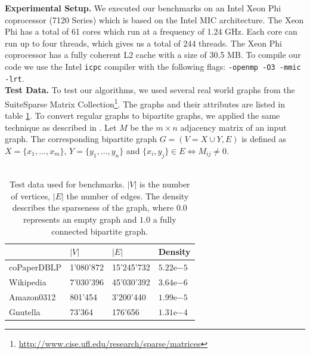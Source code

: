 \documentclass[letterpaper]{article}
\newcommand{\mypar}[1]{{\bf #1.}}
\begin{document}
\mypar{Experimental Setup} 
We executed our benchmarks on an Intel Xeon Phi coprocessor (7120 Series) which is based on the Intel MIC architecture. The Xeon Phi has a total of 61 cores which run at a frequency of 1.24 GHz. Each core can run up to four threads, which gives us a total of 244 threads. The Xeon Phi coprocessor has a fully coherent L2 cache with a size of 30.5 MB. To compile our code we use the Intel \texttt{icpc} compiler with the following flags: \texttt{-openmp -O3 -mmic -lrt}.\\


\mypar{Test Data}
To test our algorithms, we used several real world graphs from the SuiteSparse Matrix Collection\footnote{\url{http://www.cise.ufl.edu/research/sparse/matrices}}.
The graphs and their attributes are listed in table \ref{table:testdata}. 
To convert regular graphs to bipartite graphs, we applied the same technique as described in \cite{Azad:2015}. 
Let $M$ be the $m \times n$ adjacency matrix of an input graph. 
The corresponding bipartite graph $G = (V = X \cup Y, E)$ is defined as $X = \{x_1, \dots, x_m\}$, $Y = \{y_1, \dots, y_n\}$ and $\{x_i, y_j\} \in E \iff M_{ij} \neq 0$.\\


\\
\begin{table}
\centering
\begin{tabular}{ |l|l|l|l| }
\hline
 & $\lvert V \rvert$ & $\lvert E \rvert$ & Density \\ \hline
coPaperDBLP & 1'080'872 & 15'245'732 & $5.22\mathrm{e}{-5}$ \\ \hline
Wikipedia & 7'030'396 & 45'030'392 & $3.64\mathrm{e}{-6}$ \\ \hline
Amazon0312 & 801'454 & 3'200'440 & $1.99\mathrm{e}{-5}$ \\ \hline
Gnutella & 73'364 & 176'656 & $1.31\mathrm{e}{-4}$ \\ \hline
\end{tabular}
\caption{Test data used for benchmarks. $\lvert V \rvert$ is the number of vertices, $\lvert E \rvert$ the number of edges. The density describes the sparseness of the graph, where $0.0$ represents an empty graph and $1.0$ a fully connected bipartite graph.}
\label{table:testdata}
\end{table}
\end{document}
